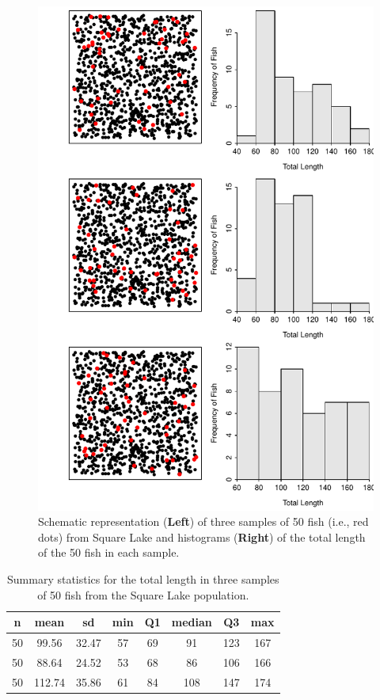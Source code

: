 \documentclass[10pt,openany]{book}\usepackage[]{graphicx}\usepackage[]{color}
\newenvironment{knitrout}{}{} %
\begin{document}
\begin{knitrout}
\color{fgcolor}\begin{figure}[hbtp]

{\centering \includegraphics[width=.7\linewidth]{Figs/SquareLakeSample234-1} 

}

\caption{Schematic representation (\textbf{Left}) of three samples of 50 fish (i.e., red dots) from Square Lake and histograms (\textbf{Right}) of the total length of the 50 fish in each sample.}\label{fig:SquareLakeSample234}
\end{figure}


\end{knitrout}

\begin{table}[htbp]
\centering
\caption{Summary statistics for the total length in three samples of 50 fish from the Square Lake population.} 
\label{tab:SquareLakeSample234}
\begin{tabular}{cccccccc}
 n & mean & sd & min & Q1 & median & Q3 & max \\ 
  \hline
50 & 99.56 & 32.47 & 57 & 69 & 91 & 123 & 167 \\ 
  50 & 88.64 & 24.52 & 53 & 68 & 86 & 106 & 166 \\ 
  50 & 112.74 & 35.86 & 61 & 84 & 108 & 147 & 174 \\ 
   \hline
\end{tabular}
\end{table}
\end{document}
